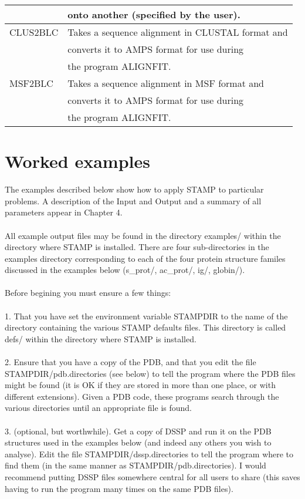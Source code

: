 \begin{center}
\begin{tabular}{|ll|}
          &   onto another (specified by the user).\\
\hline
CLUS2BLC & Takes a sequence alignment in CLUSTAL format and \\
	    &    converts it to AMPS format for use during\\
         &    the program ALIGNFIT.\\
\hline
MSF2BLC  & Takes a sequence alignment in MSF format and \\
         &    converts it to AMPS format for use during\\
         &    the program ALIGNFIT.\\
\hline
\end{tabular}
\end{center}

\chapter{Worked examples}

The examples described below show how to apply STAMP to particular 
problems.  A description of the Input and Output and a summary
of all parameters appear in Chapter 4.\\
\\
All example output files may be found in the directory examples/ 
within the directory where STAMP is installed.   There are four sub-directories
in the examples directory corresponding to each of the four protein
structure familes discussed in the examples below (s\_prot/, ac\_prot/, ig/, globin/).\\
\\
Before begining you must ensure a few things:\\
\\
1. That you have set the environment variable STAMPDIR to the name of the 
directory containing the various STAMP defaults files.  This directory is
called defs/ within the directory where STAMP is installed. \\
\\
2. Ensure that you have a copy of the PDB, and that you edit the file
STAMPDIR/pdb.directories (see below) to tell the program where the PDB 
files might be found (it is OK if they are stored in more than one place, 
or with different extensions).   Given a PDB code, these programs search 
through the various directories until an appropriate file is found.\\
\\
3. (optional, but worthwhile).  Get a copy of DSSP and run it on the PDB
structures used in the examples below (and indeed any others you wish to analyse). 
Edit the file STAMPDIR/dssp.directories to tell the program where to find them (in the 
same manner as STAMPDIR/pdb.directories).  I would recommend putting DSSP files
somewhere central for all users to share (this saves having to run the program many
times on the same PDB files).

